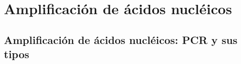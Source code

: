 \documentclass{AsignaturaResumen}
\begin{document}
\part{Amplificación de ácidos nucléicos}

    \chapter{Amplificación de ácidos nucléicos: PCR y sus tipos} 


    \PlainGeom
    \appendix



    \backmatter

\Bibliografia
\Glosarios
\end{document}
